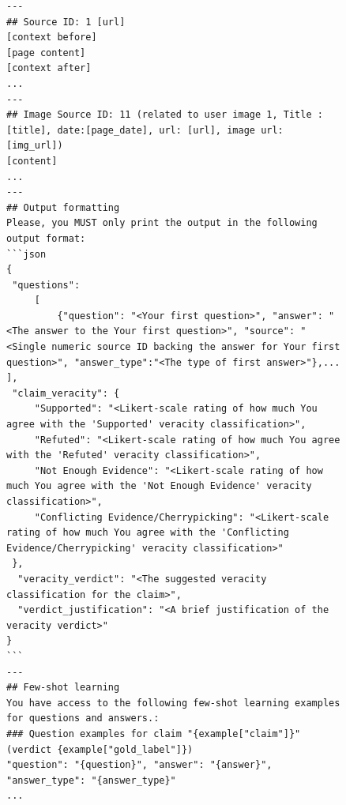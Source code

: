 \begin{figure}
\begin{lstlisting}
---
## Source ID: 1 [url]
[context before]
[page content]
[context after]
...
---
## Image Source ID: 11 (related to user image 1, Title : [title], date:[page_date], url: [url], image url: [img_url])
[content]
...
---
## Output formatting
Please, you MUST only print the output in the following output format:
```json
{
 "questions":
     [
         {"question": "<Your first question>", "answer": "<The answer to the Your first question>", "source": "<Single numeric source ID backing the answer for Your first question>", "answer_type":"<The type of first answer>"},...   ],
 "claim_veracity": {
     "Supported": "<Likert-scale rating of how much You agree with the 'Supported' veracity classification>",
     "Refuted": "<Likert-scale rating of how much You agree with the 'Refuted' veracity classification>",
     "Not Enough Evidence": "<Likert-scale rating of how much You agree with the 'Not Enough Evidence' veracity classification>",
     "Conflicting Evidence/Cherrypicking": "<Likert-scale rating of how much You agree with the 'Conflicting Evidence/Cherrypicking' veracity classification>"
 },
  "veracity_verdict": "<The suggested veracity classification for the claim>",
  "verdict_justification": "<A brief justification of the veracity verdict>"
}
```
---
## Few-shot learning
You have access to the following few-shot learning examples for questions and answers.:
### Question examples for claim "{example["claim"]}" (verdict {example["gold_label"]})
"question": "{question}", "answer": "{answer}", "answer_type": "{answer_type}"
...
    \end{lstlisting}
\end{figure}